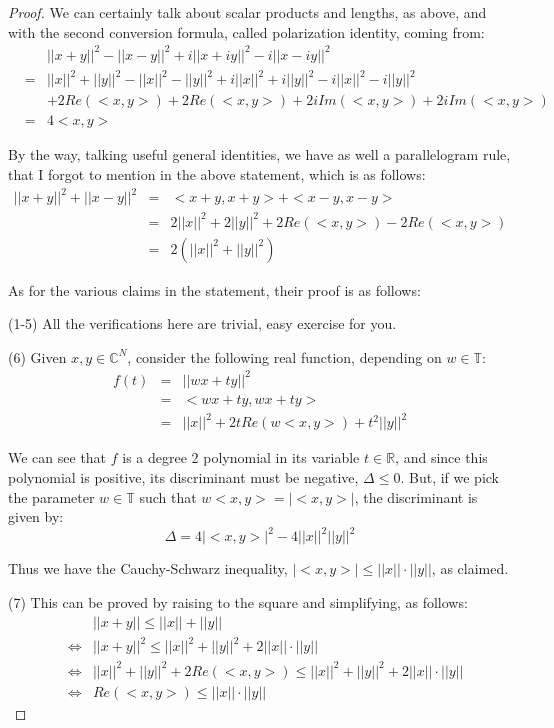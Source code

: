 \documentclass[12pt]{amsbook}
\begin{document}
\begin{proof}
We can certainly talk about scalar products and lengths, as above, and with the second conversion formula, called polarization identity, coming from:
\begin{eqnarray*}
&&||x+y||^2-||x-y||^2+i||x+iy||^2-i||x-iy||^2\\
&=&||x||^2+||y||^2-||x||^2-||y||^2+i||x||^2+i||y||^2-i||x||^2-i||y||^2\\
&&+2Re(<x,y>)+2Re(<x,y>)+2iIm(<x,y>)+2iIm(<x,y>)\\
&=&4<x,y>
\end{eqnarray*}

By the way, talking useful general identities, we have as well a parallelogram rule, that I forgot to mention in the above statement, which is as follows:
\begin{eqnarray*}
||x+y||^2+||x-y||^2
&=&<x+y,x+y>+<x-y,x-y>\\
&=&2||x||^2+2||y||^2+2Re(<x,y>)-2Re(<x,y>)\\
&=&2(||x||^2+||y||^2)
\end{eqnarray*}

As for the various claims in the statement, their proof is as follows:

\medskip

(1-5) All the verifications here are trivial, easy exercise for you.

\medskip

(6) Given $x,y\in\mathbb C^N$, consider the following real function, depending on $w\in\mathbb T$:
\begin{eqnarray*}
f(t)
&=&||wx+ty||^2\\
&=&<wx+ty,wx+ty>\\
&=&||x||^2+2tRe(w<x,y>)+t^2||y||^2
\end{eqnarray*}

We can see that $f$ is a degree 2 polynomial in its variable $t\in\mathbb R$, and since this polynomial is positive, its discriminant must be negative, $\Delta\leq0$. But, if we pick the parameter $w\in\mathbb T$ such that $w<x,y>=|<x,y>|$, the discriminant is given by:
$$\Delta=4|<x,y>|^2-4||x||^2||y||^2$$

Thus we have the Cauchy-Schwarz inequality, $|<x,y>|\leq||x||\cdot||y||$, as claimed. 

\medskip

(7) This can be proved by raising to the square and simplifying, as follows:
\begin{eqnarray*}
&&||x+y||\leq||x||+||y||\\
&\iff&||x+y||^2\leq||x||^2+||y||^2+2||x||\cdot||y||\\
&\iff&||x||^2+||y||^2+2Re(<x,y>)\leq||x||^2+||y||^2+2||x||\cdot||y||\\
&\iff&Re(<x,y>)\leq||x||\cdot||y||
\end{eqnarray*}


\end{proof}
\end{document}
